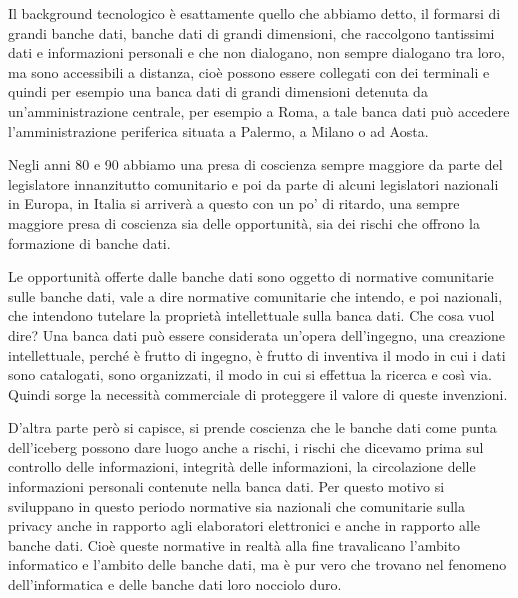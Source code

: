 Il background tecnologico è esattamente quello che abbiamo detto, il formarsi di grandi banche dati, banche dati di grandi dimensioni, che raccolgono tantissimi dati e informazioni personali e che non dialogano, non sempre dialogano tra loro, ma sono accessibili a distanza, cioè possono essere collegati con dei terminali e quindi per esempio una banca dati di grandi dimensioni detenuta da un'amministrazione centrale, per esempio a Roma, a tale banca dati può accedere l'amministrazione periferica situata a Palermo, a Milano o ad Aosta. 

Negli anni 80 e 90 abbiamo una presa di coscienza sempre maggiore da parte del legislatore innanzitutto comunitario e poi da parte di alcuni legislatori nazionali in Europa, in Italia si arriverà a questo con un po' di ritardo, una sempre maggiore presa di coscienza sia delle opportunità, sia dei rischi che offrono la formazione di banche dati.\par
Le opportunità offerte dalle banche dati sono oggetto di normative comunitarie sulle banche dati, vale a dire normative comunitarie che intendo, e poi nazionali, che intendono tutelare la proprietà intellettuale sulla banca dati. Che cosa vuol dire? Una banca dati può essere considerata un'opera dell'ingegno, una creazione intellettuale, perché è frutto di ingegno, è frutto di inventiva il modo in cui i dati sono catalogati, sono organizzati, il modo in cui si effettua la ricerca e così via. Quindi sorge la necessità commerciale di proteggere il valore di queste invenzioni.\par 
D'altra parte però si capisce, si prende coscienza che le banche dati come punta dell'iceberg possono dare luogo anche a rischi, i rischi che dicevamo prima sul controllo delle informazioni, integrità delle informazioni, la circolazione delle informazioni personali contenute nella banca dati. Per questo motivo si sviluppano in questo periodo normative  sia nazionali che comunitarie sulla privacy anche in rapporto agli elaboratori elettronici e anche in rapporto alle banche dati. Cioè queste normative in realtà alla fine travalicano l'ambito informatico e l'ambito delle banche dati, ma è pur vero che trovano nel fenomeno dell'informatica e delle banche dati loro nocciolo duro. \par
